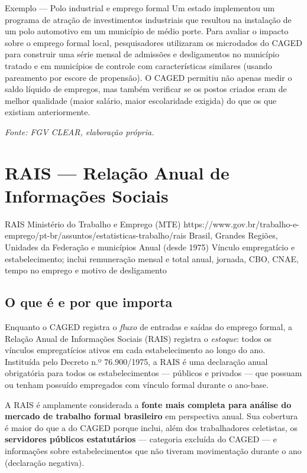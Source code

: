\begin{boxexemplo}{Exemplo — Polo industrial e emprego formal}
Um estado implementou um programa de atração de investimentos industriais que resultou na instalação de um polo automotivo em um município de médio porte. Para avaliar o impacto sobre o emprego formal local, pesquisadores utilizaram os microdados do CAGED para construir uma série mensal de admissões e desligamentos no município tratado e em municípios de controle com características similares (usando pareamento por escore de propensão). O CAGED permitiu não apenas medir o saldo líquido de empregos, mas também verificar se os postos criados eram de melhor qualidade (maior salário, maior escolaridade exigida) do que os que existiam anteriormente.

\textit{Fonte: FGV CLEAR, elaboração própria.}
\end{boxexemplo}

\section{RAIS — Relação Anual de Informações Sociais}

\ficharapida
  {RAIS}
  {Ministério do Trabalho e Emprego (MTE)}
  {https://www.gov.br/trabalho-e-emprego/pt-br/assuntos/estatisticas-trabalho/rais}
  {Brasil, Grandes Regiões, Unidades da Federação e municípios}
  {Anual (desde 1975)}
  {Vínculo empregatício e estabelecimento; inclui remuneração mensal e total anual, jornada, CBO, CNAE, tempo no emprego e motivo de desligamento}

\subsection{O que é e por que importa}

Enquanto o CAGED registra o \textit{fluxo} de entradas e saídas do emprego formal, a Relação Anual de Informações Sociais (RAIS) registra o \textit{estoque}: todos os vínculos empregatícios ativos em cada estabelecimento ao longo do ano. Instituída pelo Decreto n.º 76.900/1975, a RAIS é uma declaração anual obrigatória para todos os estabelecimentos — públicos e privados — que possuam ou tenham possuído empregados com vínculo formal durante o ano-base.

A RAIS é amplamente considerada a \textbf{fonte mais completa para análise do mercado de trabalho formal brasileiro} em perspectiva anual. Sua cobertura é maior do que a do CAGED porque inclui, além dos trabalhadores celetistas, os \textbf{servidores públicos estatutários} — categoria excluída do CAGED — e informações sobre estabelecimentos que não tiveram movimentação durante o ano (declaração negativa).

